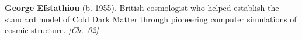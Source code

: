 \textbf{George Efstathiou} (b. 1955). British cosmologist who helped establish the standard model of Cold Dark Matter through pioneering computer simulations of cosmic structure. \emph{[Ch.~\hyperref[ch:acceleratinguniverse]{02}]}

